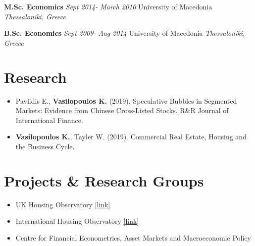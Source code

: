 \documentclass[10pt,]{article}
\begin{document}
              \textbf{M.Sc. Economics} \hfill  { \emph{Sept 2014- March 2016} }
              \newline  University of Macedonia \hfill { \emph{Thessaloniki, Greece} }
              
              \textbf{B.Sc. Economics} \hfill  { \emph{Sept 2009- Aug 2014} }
              \newline  University of Macedonia \hfill { \emph{Thessaloniki, Greece} }
              
              \hypertarget{research}{%
              \section{Research}\label{research}}
              
              \begin{itemize}
              \item
                Pavlidis E., \textbf{Vasilopoulos K.} (2019). Speculative Bubbles in
                Segmented Markets: Evidence from Chinese Cross-Listed Stocks. R\&R
                Journal of International Finance.
              \item
                \textbf{Vasilopoulos K.}, Tayler W. (2019). Commercial Real Estate,
                Housing and the Business Cycle.
              \end{itemize}
              
              \hypertarget{projects-research-groups}{%
              \section{Projects \& Research Groups}\label{projects-research-groups}}
              
              \begin{itemize}
              \item
                UK Housing Observatory
                \href{http://www.lancaster.ac.uk/lums/economics/research/housing/}{{[}link{]}}
              \item
                International Housing Observatory
                \href{https://lancs-macro.shinyapps.io/international-housing-observatory/}{{[}link{]}}
              \item
                Centre for Financial Econometrics, Asset Markets and Macroeconomic
                Policy
              \end{itemize}
              
\end{document}
